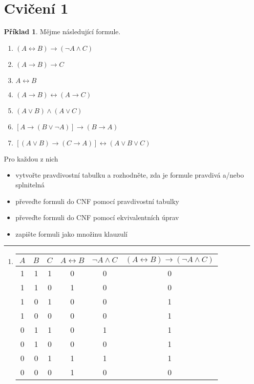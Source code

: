 \documentclass[a4paper]{article}
\theoremstyle{definition}
\newtheorem{priklad}{Příklad}
\begin{document}
\section*{Cvičení 1}
\setcounter{priklad}{0}
\begin{priklad}
    Mějme následující formule.
    \begin{enumerate}
        \item $ (A \leftrightarrow B)\rightarrow (\neg A\wedge C) $
        \item $ (A\rightarrow B)\rightarrow C $
        \item $ A\leftrightarrow B $
        \item $ (A\rightarrow B)\leftrightarrow (A\rightarrow C) $
        \item $ (A\vee B)\wedge (A\vee C) $
        \item $ \left[A\rightarrow (B\vee \neg A)\right]\rightarrow (B\rightarrow A) $
        \item $ \left[(A\vee B)\rightarrow (C\rightarrow A)\right]\leftrightarrow (A\vee B\vee C) $
    \end{enumerate}
    
    Pro každou z nich
    \begin{itemize}
        \item vytvořte pravdivostní tabulku a rozhodněte, zda je formule pravdivá a/nebo splnitelná
        \item převeďte formuli do CNF pomocí pravdivostní tabulky
        \item převeďte formuli do CNF pomocí ekvivalentních úprav
        \item zapište formuli jako množinu klauzulí
    \end{itemize}
\noindent\rule{\linewidth}{.2pt}
    \begin{enumerate}
        \item        
            \begin{tabular}{|c|c|c|c|c|c|}
                \hline 
                $ A $ & $ B $ & $ C $ & $ A\leftrightarrow B$ & $\neg A\wedge C $ & $ (A \leftrightarrow B)\rightarrow (\neg A\wedge C) $ \\ 
                \hline 
                1 & 1 & 1 & 0 & 0 & 0 \\
                1 & 1 & 0 & 1 & 0 & 0 \\
                1 & 0 & 1 & 0 & 0 & 1 \\
                1 & 0 & 0 & 0 & 0 & 1 \\
                0 & 1 & 1 & 0 & 1 & 1 \\
                0 & 1 & 0 & 0 & 0 & 1 \\
                0 & 0 & 1 & 1 & 1 & 1 \\
                0 & 0 & 0 & 1 & 0 & 0 \\ 
                \hline 
            \end{tabular} 
    

\end{enumerate}
\end{priklad}
\end{document}
